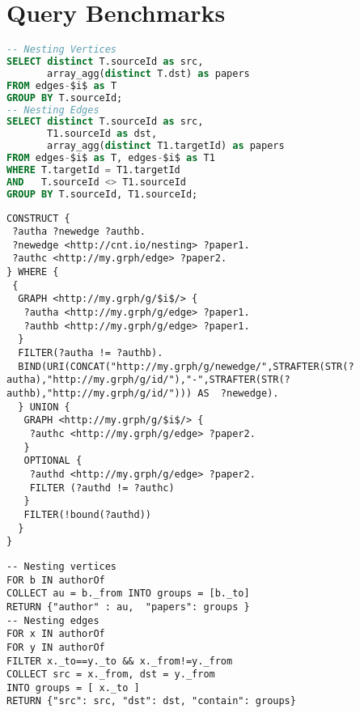\section{Query Benchmarks}
\begin{lstlisting}[caption={Graph Nesting in PostgreSQL's SQL dialect. Two distinct tables are created for both vertices and edges. },language=SQL,frameround=fttt,frame=trBL,mathescape=true,label=SQLNesting]
-- Nesting Vertices
SELECT distinct T.sourceId as src, 
       array_agg(distinct T.dst) as papers 
FROM edges-$i$ as T 
GROUP BY T.sourceId;
-- Nesting Edges
SELECT distinct T.sourceId as src, 
       T1.sourceId as dst, 
       array_agg(distinct T1.targetId) as papers
FROM edges-$i$ as T, edges-$i$ as T1 
WHERE T.targetId = T1.targetId 
AND   T.sourceId <> T1.sourceId 
GROUP BY T.sourceId, T1.sourceId;
\end{lstlisting}


\begin{lstlisting}[caption={Graph Nesting in SPARQL. We use properties to associate to either vertices and edges the nesting content.},language=SPARQL,frameround=fttt,frame=trBL,tabsize=2,mathescape=true,label=SPARQLNesting]
CONSTRUCT {
 ?autha ?newedge ?authb.
 ?newedge <http://cnt.io/nesting> ?paper1.
 ?authc <http://my.grph/edge> ?paper2.
} WHERE {
 {
  GRAPH <http://my.grph/g/$i$/> {
   ?autha <http://my.grph/g/edge> ?paper1.
   ?authb <http://my.grph/g/edge> ?paper1.
  }
  FILTER(?autha != ?authb).
  BIND(URI(CONCAT("http://my.grph/g/newedge/",STRAFTER(STR(?autha),"http://my.grph/g/id/"),"-",STRAFTER(STR(?authb),"http://my.grph/g/id/"))) AS  ?newedge).
  } UNION {
   GRAPH <http://my.grph/g/$i$/> {
    ?authc <http://my.grph/g/edge> ?paper2. 
   }
   OPTIONAL {
    ?authd <http://my.grph/g/edge> ?paper2.
    FILTER (?authd != ?authc)
   }
   FILTER(!bound(?authd))
  }
}
\end{lstlisting}

\begin{lstlisting}[caption={Graph Nesting in ArangoDB using AQL. All the fields marked with an underscore represent externally indexed structures.},language=AQL,frameround=fttt,frame=trBL,tabsize=2,mathescape=true,label=AQLQueryNesting]
-- Nesting vertices
FOR b IN authorOf 
COLLECT au = b._from INTO groups = [b._to] 
RETURN {"author" : au,  "papers": groups }
-- Nesting edges
FOR x IN authorOf 
FOR y IN authorOf 
FILTER x._to==y._to && x._from!=y._from 
COLLECT src = x._from, dst = y._from 
INTO groups = [ x._to ] 
RETURN {"src": src, "dst": dst, "contain": groups}
\end{lstlisting}


